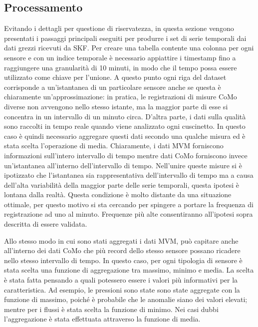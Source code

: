 \subsection{Processamento}
Evitando i dettagli per questione di riservatezza, in questa sezione vengono presentati i passaggi principali eseguiti per produrre i set di serie temporali dai dati grezzi ricevuti da SKF. 
Per creare una tabella contente una colonna per ogni sensore e con un indice temporale è necessario appiattire i timestamp fino a raggiungere una granularità di 10 minuti, in modo che il tempo possa essere utilizzato come chiave per l'unione. A questo punto ogni riga del dataset corrisponde a un'istantanea di un particolare sensore anche se questa è chiaramente un'approssimazione: in pratica, le registrazioni di misure CoMo diverse non avvengono nello stesso istante, ma la maggior parte di esse si concentra in un intervallo di un minuto circa. 
D'altra parte, i dati sulla qualità sono raccolti in tempo reale quando viene analizzato ogni cuscinetto. In questo caso è quindi necessario aggregare questi dati secondo una qualche misura ed è stata scelta l'operazione di media.
Chiaramente, i dati MVM forniscono informazioni sull'intero intervallo di tempo mentre dati CoMo forniscono invece un'istantanea all'interno dell'intervallo di tempo.
Nell'unire queste misure si è ipotizzato che l'istantanea sia rappresentativa dell'intervallo di tempo ma a causa dell'alta variabilità della maggior parte delle serie temporali, questa ipotesi è lontana dalla realtà.
Questa condizione è molto distante da una situazione ottimale, per questo motivo si sta cercando per spingere a portare la frequenza di registrazione ad uno al minuto. Frequenze più alte consentiranno all'ipotesi sopra descritta di essere validata.

Allo stesso modo in cui sono stati aggregati i dati MVM, può capitare anche all'interno dei dati CoMo che più record dello stesso sensore possano ricadere nello stesso intervallo di tempo. In questo caso, per ogni tipologia di sensore è stata scelta una funzione di aggregazione tra massimo, minimo e media. La scelta è stata fatta pensando a quali potessero essere i valori più informativi per la caratteristica. Ad esempio, le pressioni sono state sono state aggregate con la funzione di massimo, poiché è probabile che le anomalie siano dei valori elevati; mentre per i flussi è stata scelta la funzione di minimo. Nei casi dubbi l'aggregazione è stata effettuata attraverso la funzione di media.

